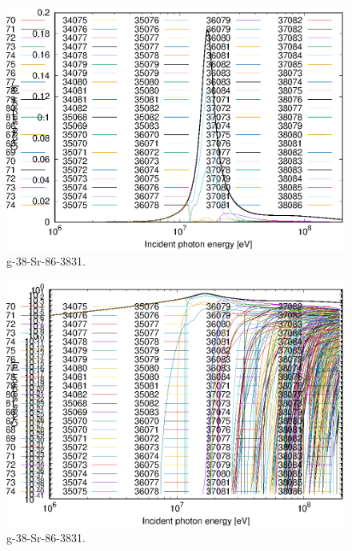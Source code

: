 \begin{figure}
 \includegraphics[width=\linewidth]{eps/g_38-Sr-86_3831.eps}
  \caption{g-38-Sr-86-3831.}
\end{figure}
\begin{figure}
 \includegraphics[width=\linewidth]{eps-log/g_38-Sr-86_3831.eps}
 \caption{g-38-Sr-86-3831.}
\end{figure}
\newpage \clearpage

